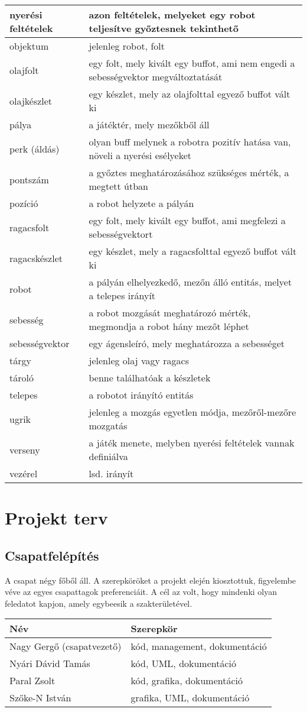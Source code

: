 \begin{tabularx}{\textwidth}{| l | l |}
    nyerési feltételek &  azon feltételek, melyeket egy robot teljesítve győztesnek tekinthető \tabularnewline \hline
    objektum &  jelenleg robot, folt \tabularnewline \hline
    olajfolt &  egy folt, mely kivált egy buffot, ami nem engedi a sebességvektor megváltoztatását \tabularnewline \hline
    olajkészlet &  egy készlet, mely az olajfolttal egyező buffot vált ki \tabularnewline \hline
    pálya &  a játéktér, mely mezőkből áll \tabularnewline \hline
    perk (áldás) & olyan buff melynek a robotra pozitív hatása van, növeli a nyerési esélyeket  \tabularnewline \hline
    pontszám &  a győztes meghatározásához szükséges mérték, a megtett útban \tabularnewline \hline
    pozíció &  a robot helyzete a pályán \tabularnewline \hline
    ragacsfolt &  egy folt, mely kivált egy buffot, ami megfelezi a sebességvektort \tabularnewline \hline
    ragacskészlet &  egy készlet, mely a ragacsfolttal egyező buffot vált ki \tabularnewline \hline
    robot &  a pályán elhelyezkedő, mezőn álló entitás, melyet a telepes irányít \tabularnewline \hline
    sebesség &  a robot mozgását meghatározó mérték, megmondja a robot hány mezőt léphet \tabularnewline \hline
    sebességvektor &  egy ágensleíró, mely meghatározza a sebességet \tabularnewline \hline
    tárgy & jelenleg olaj vagy ragacs   \tabularnewline \hline
    tároló &  benne találhatóak a készletek \tabularnewline \hline
    telepes &  a robotot irányító entitás \tabularnewline \hline
    ugrik &  jelenleg a mozgás egyetlen módja, mezőről-mezőre mozgatás \tabularnewline \hline
    verseny &  a játék menete, melyben nyerési feltételek vannak definiálva \tabularnewline \hline
    vezérel & lsd. irányít \tabularnewline \hline
\end{tabularx}

\section{Projekt terv}
\subsection{Csapatfelépítés}
A csapat négy főből áll. A szerepköröket a projekt elején kiosztottuk, figyelembe véve az egyes csapattagok preferenciáit. A cél az volt, hogy mindenki olyan feledatot kapjon, amely egybeesik a szakterületével.

\begin{tabularx}{\textwidth}{| l | l |}
\hline
\textbf{Név} & \textbf{Szerepkör} \tabularnewline 
\hline\hline
\endhead
Nagy Gergő (csapatvezető) & kód, management, dokumentáció \tabularnewline \hline
Nyári Dávid Tamás & kód, UML, dokumentáció \tabularnewline \hline
Paral Zsolt & kód, grafika, dokumentáció \tabularnewline \hline
Szőke-N István & grafika, UML, dokumentáció \tabularnewline \hline
\end{tabularx}

